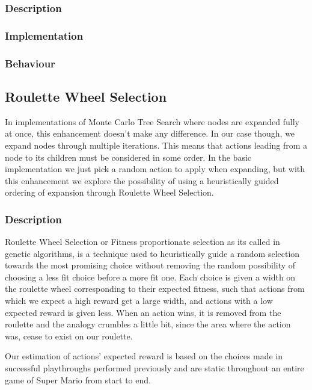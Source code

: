 \documentclass[10pt,a4paper]{article}
\begin{document}
\subsubsection{Description}

\subsubsection{Implementation}
\subsubsection{Behaviour}
\subsection{Roulette Wheel Selection}
In implementations of Monte Carlo Tree Search where nodes are expanded fully at once, this enhancement doesn't make any difference. In our case though, we expand nodes through multiple iterations. This means that actions leading from a node to its children must be considered in some order. In the basic implementation we just pick a random action to apply when expanding, but with this enhancement we explore the possibility of using a heuristically guided ordering of expansion through Roulette Wheel Selection.

\subsubsection{Description}
Roulette Wheel Selection or Fitness proportionate selection as its called in genetic algorithms, is a technique used to heuristically guide a random selection towards the most promising choice without removing the random possibility of choosing a less fit choice before a more fit one. Each choice is given a width on the roulette wheel corresponding to their expected fitness, such that actions from which we expect a high reward get a large width, and actions with a low expected reward is given less.
When an action wins, it is removed from the roulette and the analogy crumbles a little bit, since the area where the action was, cease to exist on our roulette.

Our estimation of actions' expected reward is based on the choices made in successful playthroughs performed previously and are static throughout an entire game of Super Mario from start to end.
\end{document}
